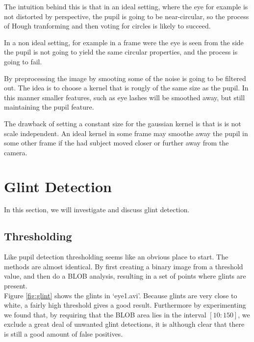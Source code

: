 \documentclass[a4paper,11pt]{article}
\begin{document}
The intuition behind this is that in an ideal setting, where the eye for example is not distorted by perspective, the pupil is going to be near-circular, so the process of Hough tranforming and then voting for circles is likely to succeed.

In a non ideal setting, for example in a frame were the eye is seen from the side the pupil is not going to yield the same circular properties, and the process is going to fail.

By preprocessing the image by smooting some of the noise is going to be filtered out. The idea is to choose a kernel that is rougly of the same size as the pupil. In this manner smaller features, such as eye lashes will be smoothed away, but still maintaining the pupil feature.

The drawback of setting a constant size for the gaussian kernel is that is is not scale independent. An ideal kernel in some frame may smoothe away the pupil in some other frame if the had subject moved closer or further away from the camera.



\section{Glint Detection}
In this section, we will investigate and discuss glint detection.

\subsection{Thresholding}
Like pupil detection thresholding seems like an obvious place to start. The methods are almost identical. By first creating a binary image from a threshold value, and then do a BLOB analysis, resulting  in a set of points where glints are present.\\

Figure \ref{fig:glint} shows the glints in ‘eye1.avi’. Because glints are very close to white, a fairly high threshold gives a good result. Furthermore by experimenting we found that, by requiring that the BLOB area lies in the interval $[10:150]$, we exclude a great deal of unwanted glint detections, it is although clear that there is still a good amount of false positives.
\end{document}
